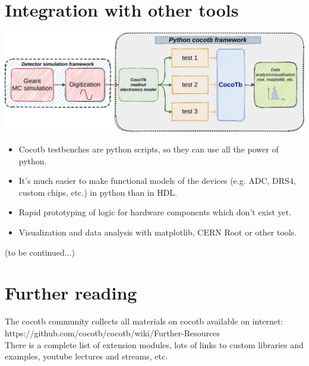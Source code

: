 \documentclass[aspectratio=169]{beamer}
\begin{document}
\section*{Integration with other tools}
\begin{frame}{\secname}

  \includegraphics[width=1.0\textwidth]{figs/cocotb_integration.pdf}

  \vspace*{-3mm}
  \begin{itemize}
    \item Cocotb testbenches are python scripts, so they can use all the power of python. 
    \item It's much easier to make functional models of the devices 
      (e.g. ADC, DRS4, custom chips, etc.) in python than in HDL. 
    \item Rapid prototyping of logic for hardware components which don't exist yet. 
    \item Visualization and data analysis with matplotlib, CERN Root or other tools. 
  \end{itemize}
  
   \centering
   (to be continued...)
\end{frame}

\section*{Further reading}
\begin{frame}[fragile]{\secname}
  The cocotb community collects all materials on cocotb available on internet: 
  {\color{blue} https://github.com/cocotb/cocotb/wiki/Further-Resources} \\
  There is a complete list of extension modules, lots of links to custom libraries and examples, youtube lectures and streams, etc. 
    
\end{frame}
\end{document}
